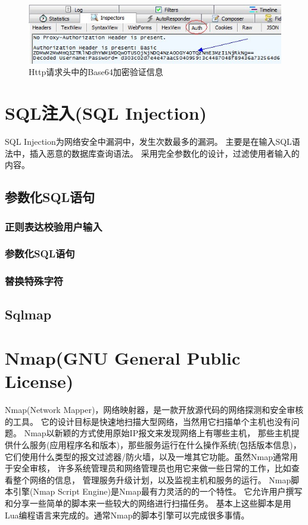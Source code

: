 \documentclass{book}
\begin{document}
\begin{figure}[htbp]
	\centering
	\includegraphics[scale=0.8]{HttpHeaderAuthorizationInfo.jpg}
	\caption{Http请求头中的Base64加密验证信息}
	\label{fig:HttpHeaderAuthorizationInfo}
\end{figure}

\section{SQL注入(SQL Injection)}

SQL Injection为网络安全中漏洞中，发生次数最多的漏洞。
主要是在输入SQL语法中，插入恶意的数据库查询语法。
采用完全参数化的设计，过滤使用者输入的内容。


\subsection{参数化SQL语句}

\subsubsection{正则表达校验用户输入}

\subsubsection{参数化SQL语句}

\subsubsection{替换特殊字符}

\subsection{Sqlmap}



\section{Nmap(GNU General Public License)}

Nmap(Network Mapper)，网络映射器，是一款开放源代码的网络探测和安全审核的工具。
它的设计目标是快速地扫描大型网络，当然用它扫描单个主机也没有问题。
Nmap以新颖的方式使用原始IP报文来发现网络上有哪些主机，
那些主机提供什么服务(应用程序名和版本)，那些服务运行在什么操作系统(包括版本信息)，
它们使用什么类型的报文过滤器/防火墙，以及一堆其它功能。虽然Nmap通常用于安全审核，
许多系统管理员和网络管理员也用它来做一些日常的工作，比如查看整个网络的信息，
管理服务升级计划，以及监视主机和服务的运行。
Nmap脚本引擎(Nmap Script Engine)是Nmap最有力灵活的的一个特性。
它允许用户撰写和分享一些简单的脚本来一些较大的网络进行扫描任务。
基本上这些脚本是用Lua编程语言来完成的。通常Nmap的脚本引擎可以完成很多事情。
\end{document}
